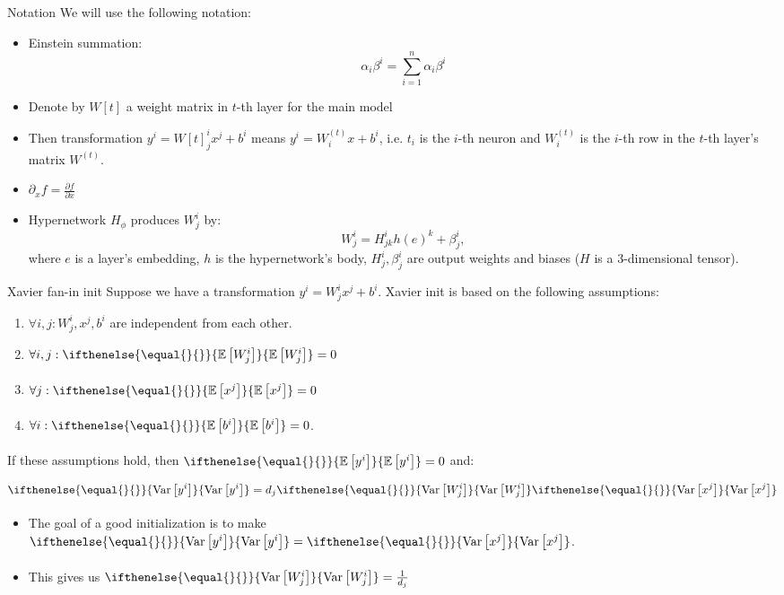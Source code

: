 \documentclass[handout, 10pt]{beamer}
\newcommand{\expect}[2][]{
\ifthenelse{\equal{#1}{}}{
\mathbb{E}\left[#2\right]
}{
\underset{#1}{\mathbb{E}}\left[#2\right]
}}
\newcommand{\var}[2][]{
\ifthenelse{\equal{#1}{}}{
\text{Var}\left[#2\right]
}{
\underset{#1}{\text{Var}}\left[#2\right]
}}
\begin{document}
\begin{frame}{Notation}
\pause We will use the following notation:
\begin{itemize}
    \item\pause Einstein summation:
\[
\alpha_i \beta^i = \sum_{i=1}^n \alpha_i \beta^i
\]
    \item\pause Denote by $W[t]$ a weight matrix in $t$-th layer for the main model
    \item\pause Then transformation $y^i = W[t]_j^i x^j + b^i$ means $y^i = W^{(t)}_i x + b^i$, i.e. $t_i$ is the $i$-th neuron and $W^{(t)}_i$ is the $i$-th row in the $t$-th layer's matrix $W^{(t)}$.
    \item\pause $\partial_x f = \frac{\partial f}{\partial x}$
    \item\pause Hypernetwork $H_\phi$ produces $W_j^i$ by:
    \[
    W_j^i = H_{jk}^i h(e)^k + \beta_j^i,
    \]
    where $e$ is a layer's embedding, $h$ is the hypernetwork's body, $H_{j}^i, \beta^i_j$ are output weights and biases ($H$ is a 3-dimensional tensor). 
\end{itemize}

\end{frame}

\begin{frame}{Xavier fan-in init}
    \pause Suppose we have a transformation $y^i = W_j^i x^j + b^i$. Xavier init is based on the following assumptions:
    \begin{enumerate}
        \item\pause $\forall i,j: W_j^i, x^j, b^i$ are independent from each other.
        \item\pause $\forall i,j: \expect{W_j^i} = 0$
        \item\pause $\forall j: \expect{x^j} = 0$
        \item\pause $\forall i: \expect{b^i} = 0$.
    \end{enumerate}
    
    \pause If these assumptions hold, then $\expect{y^i} = 0$ and:
    \[
    \var{y^i} = d_j \var{W_j^i} \var{x^j}
    \]

    \begin{itemize}
        \item\pause The goal of a good initialization is to make $\var{y^i} = \var{x^j}$.
        \item\pause This gives us $\var{W_j^i} = \frac{1}{d_j}$
    \end{itemize}
\end{frame}
\end{document}
